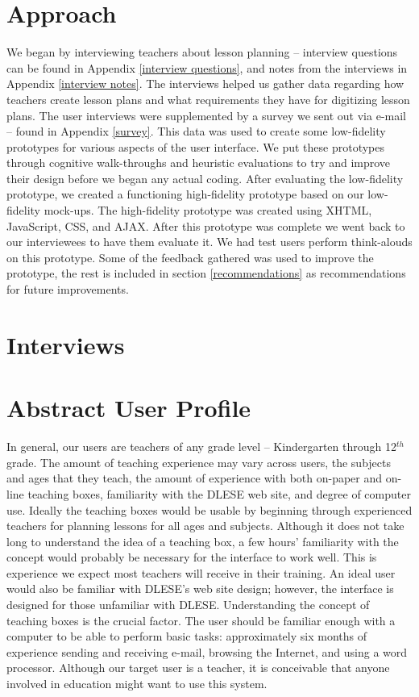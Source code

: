 \documentclass[10pt,letter,titlepage]{article}
\begin{document}
\section{Approach}
We began by interviewing teachers about lesson planning -- interview questions
can be found in Appendix \ref{interview questions}, and notes from the
interviews in Appendix \ref{interview notes}. The interviews helped us gather
data regarding how teachers create lesson plans and what requirements they have
for digitizing lesson plans. The user interviews were supplemented by a survey
we sent out via e-mail -- found in Appendix \ref{survey}. This data was used to
create some low-fidelity prototypes for various aspects of the user interface.
We put these prototypes through cognitive walk-throughs and heuristic
evaluations to try and improve their design before we began any actual coding.
After evaluating the low-fidelity prototype, we created a functioning
high-fidelity prototype based on our low-fidelity mock-ups. The high-fidelity
prototype was created using XHTML, JavaScript, CSS, and AJAX. After this
prototype was complete we went back to our interviewees to have them evaluate
it. We had test users perform think-alouds on this prototype. Some of the
feedback gathered was used to improve the prototype, the rest is included in
section \ref{recommendations} as recommendations for future improvements.

\section{Interviews}


\section{Abstract User Profile}
In general, our users are teachers of any grade level -- Kindergarten through
12$^{th}$ grade. The amount of teaching experience may vary across users, the
subjects and ages that they teach, the amount of experience with both on-paper
and on-line teaching boxes, familiarity with the DLESE web site, and degree of
computer use.  Ideally the teaching boxes would be usable by beginning through
experienced teachers for planning lessons for all ages and subjects.  Although
it does not take long to understand the idea of a teaching box, a few
hours' familiarity with the concept would probably be necessary for the
interface to work well.  This is experience we expect most teachers will receive
in their training.  An ideal user would also be familiar with DLESE's web site
design; however, the interface is designed for those unfamiliar with DLESE.
Understanding the concept of teaching boxes is the crucial factor.  The user
should be familiar enough with a computer to be able to perform basic tasks:
approximately six months of experience sending and receiving e-mail, browsing
the Internet, and using a word processor.  Although our target user is a
teacher, it is conceivable that anyone involved in education might want to use
this system.
\end{document}
